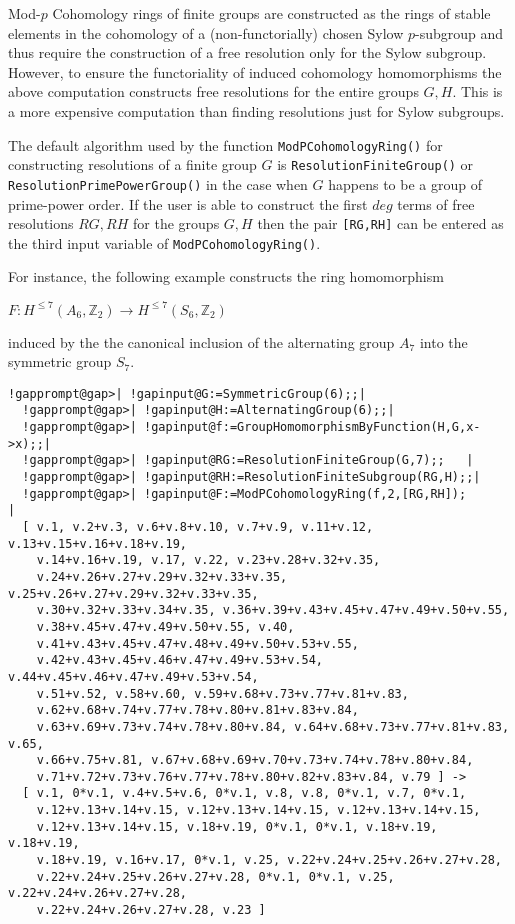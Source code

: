 \documentclass[a4paper,11pt]{report}
\begin{document}
{{\begin{Verbatim}[commandchars=!@|,fontsize=\small,frame=single,label=Example]
\end{Verbatim}
 

Mod-$p$ Cohomology rings of finite groups are constructed as the rings of stable
elements in the cohomology of a (non-functorially) chosen Sylow $p$-subgroup and thus require the construction of a free resolution only for the
Sylow subgroup. However, to ensure the functoriality of induced cohomology
homomorphisms the above computation constructs free resolutions for the entire
groups $G,H$. This is a more expensive computation than finding resolutions just for Sylow
subgroups. 

The default algorithm used by the function \texttt{ModPCohomologyRing()} for constructing resolutions of a finite group $G$ is \texttt{ResolutionFiniteGroup()} or \texttt{ResolutionPrimePowerGroup()} in the case when $G$ happens to be a group of prime-power order. If the user is able to construct
the first $deg$ terms of free resolutions $RG, RH$ for the groups $G, H$ then the pair \texttt{[RG,RH]} can be entered as the third input variable of \texttt{ModPCohomologyRing()}. 

For instance, the following example constructs the ring homomorphism 

$F\colon H^{\le 7}(A_6,\mathbb Z_2) \rightarrow H^{\le 7}(S_6,\mathbb Z_2)$ 

 induced by the the canonical inclusion of the alternating group $A_7$ into the symmetric group $S_7$. 
\begin{Verbatim}[commandchars=!@|,fontsize=\small,frame=single,label=Example]
  !gapprompt@gap>| !gapinput@G:=SymmetricGroup(6);;|
  !gapprompt@gap>| !gapinput@H:=AlternatingGroup(6);;|
  !gapprompt@gap>| !gapinput@f:=GroupHomomorphismByFunction(H,G,x->x);;|
  !gapprompt@gap>| !gapinput@RG:=ResolutionFiniteGroup(G,7);;   |
  !gapprompt@gap>| !gapinput@RH:=ResolutionFiniteSubgroup(RG,H);;|
  !gapprompt@gap>| !gapinput@F:=ModPCohomologyRing(f,2,[RG,RH]);       |
  [ v.1, v.2+v.3, v.6+v.8+v.10, v.7+v.9, v.11+v.12, v.13+v.15+v.16+v.18+v.19, 
    v.14+v.16+v.19, v.17, v.22, v.23+v.28+v.32+v.35, 
    v.24+v.26+v.27+v.29+v.32+v.33+v.35, v.25+v.26+v.27+v.29+v.32+v.33+v.35, 
    v.30+v.32+v.33+v.34+v.35, v.36+v.39+v.43+v.45+v.47+v.49+v.50+v.55, 
    v.38+v.45+v.47+v.49+v.50+v.55, v.40, 
    v.41+v.43+v.45+v.47+v.48+v.49+v.50+v.53+v.55, 
    v.42+v.43+v.45+v.46+v.47+v.49+v.53+v.54, v.44+v.45+v.46+v.47+v.49+v.53+v.54,
    v.51+v.52, v.58+v.60, v.59+v.68+v.73+v.77+v.81+v.83, 
    v.62+v.68+v.74+v.77+v.78+v.80+v.81+v.83+v.84, 
    v.63+v.69+v.73+v.74+v.78+v.80+v.84, v.64+v.68+v.73+v.77+v.81+v.83, v.65, 
    v.66+v.75+v.81, v.67+v.68+v.69+v.70+v.73+v.74+v.78+v.80+v.84, 
    v.71+v.72+v.73+v.76+v.77+v.78+v.80+v.82+v.83+v.84, v.79 ] -> 
  [ v.1, 0*v.1, v.4+v.5+v.6, 0*v.1, v.8, v.8, 0*v.1, v.7, 0*v.1, 
    v.12+v.13+v.14+v.15, v.12+v.13+v.14+v.15, v.12+v.13+v.14+v.15, 
    v.12+v.13+v.14+v.15, v.18+v.19, 0*v.1, 0*v.1, v.18+v.19, v.18+v.19, 
    v.18+v.19, v.16+v.17, 0*v.1, v.25, v.22+v.24+v.25+v.26+v.27+v.28, 
    v.22+v.24+v.25+v.26+v.27+v.28, 0*v.1, 0*v.1, v.25, v.22+v.24+v.26+v.27+v.28,
    v.22+v.24+v.26+v.27+v.28, v.23 ]
  

\end{Verbatim}}}
\end{document}
